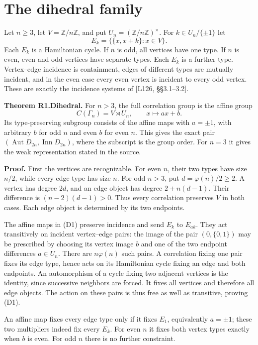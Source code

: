\section{The dihedral family}\label{the-dihedral-family}

Let \(n\ge3\), let \(V=\mathbb Z/n\mathbb Z\), and put
\(U_n=(\mathbb Z/n\mathbb Z)^\times\). For \(k\in U_n/\{\pm1\}\) let \[
E_k=\{\{x,x+k\}:x\in V\}.
\] Each \(E_k\) is a Hamiltonian cycle. If \(n\) is odd, all vertices
have one type. If \(n\) is even, even and odd vertices have separate
types. Each \(E_k\) is a further type. Vertex--edge incidence is
containment, edges of different types are mutually incident, and in the
even case every even vertex is incident to every odd vertex. These are
exactly the incidence systems of {[}L126, §§3.1--3.2{]}.

\textbf{Theorem R1.Dihedral.} For \(n>3\), the full correlation group is
the affine group \[
C(\Gamma_n)=V\rtimes U_n,
\qquad x\longmapsto ax+b.
\tag{D1}
\] Its type-preserving subgroup consists of the affine maps with
\(a=\pm1\), with arbitrary \(b\) for odd \(n\) and even \(b\) for even
\(n\). This gives the exact pair
\((\operatorname{Aut}D_{2n},\operatorname{Inn}D_{2n})\), where the
subscript is the group order. For \(n=3\) it gives the weak
representation stated in the source.

\textbf{Proof.} First the vertices are recognizable. For even \(n\),
their two types have size \(n/2\), while every edge type has size \(n\).
For odd \(n>3\), put \(d=\varphi(n)/2\ge2\). A vertex has degree \(2d\),
and an edge object has degree \(2+n(d-1)\). Their difference is
\((n-2)(d-1)>0\). Thus every correlation preserves \(V\) in both cases.
Each edge object is determined by its two endpoints.

The affine maps in (D1) preserve incidence and send \(E_k\) to
\(E_{ak}\). They act transitively on incident vertex--edge pairs: the
image of the pair \((0,\{0,1\})\) may be prescribed by choosing its
vertex image \(b\) and one of the two endpoint differences \(a\in U_n\).
There are \(n\varphi(n)\) such pairs. A correlation fixing one pair
fixes its edge type, hence acts on its Hamiltonian cycle fixing an edge
and both endpoints. An automorphism of a cycle fixing two adjacent
vertices is the identity, since successive neighbors are forced. It
fixes all vertices and therefore all edge objects. The action on these
pairs is thus free as well as transitive, proving (D1).

An affine map fixes every edge type only if it fixes \(E_1\),
equivalently \(a=\pm1\); these two multipliers indeed fix every \(E_k\).
For even \(n\) it fixes both vertex types exactly when \(b\) is even.
For odd \(n\) there is no further constraint.

